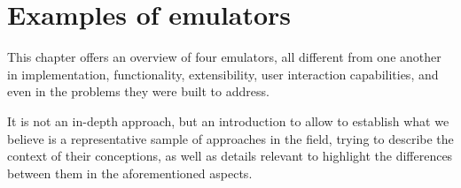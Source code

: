 
\chapter{Examples of emulators}
\label{ch:examplesofemulators}

This chapter offers an overview of four emulators, all different from one another in implementation, functionality, extensibility, user interaction capabilities, and even in the problems they were built to address.

It is not an in-depth approach, but an introduction to allow to establish what we believe is a representative sample of approaches in the field, trying to describe the context of their conceptions, as well as details relevant to highlight the differences between them in the aforementioned aspects.











